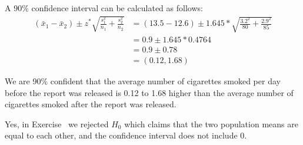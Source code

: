 %

{
A 90\% confidence interval can be calculated as follows:
\begin{align*}
(\bar{x}_1 - \bar{x}_2) \pm z^* \sqrt{ \frac{s_1^2}{n_1} + \frac{s_2^2}{n_2} } &= (13.5 - 12.6) \pm 1.645 * \sqrt{\frac{3.2^2}{80} + \frac{2.9^2}{85}} \\
&= 0.9 \pm 1.645 * 0.4764 \\
&= 0.9 \pm 0.78 \\
&= (0.12, 1.68)
\end{align*}

We are 90\% confident that the average number of cigarettes smoked per day before the report was released is 0.12 to 1.68 higher than the average number of cigarettes smoked after the report was released.

Yes, in Exercise~ we rejected $H_0$ which claims that the two population means are equal to each other, and the confidence interval does not include 0.
}

%

